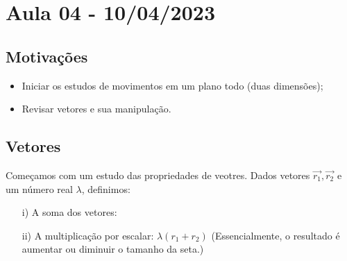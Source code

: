 \documentclass[PhysicsI/physics_notes.tex]{subfiles}
\begin{document}
\section{Aula 04 - 10/04/2023}
\subsection{Motivações}
\begin{itemize}
	\item Iniciar os estudos de movimentos em um plano todo (duas dimensões);
	\item Revisar vetores e sua manipulação.
\end{itemize}

\subsection{Vetores}
Começamos com um estudo das propriedades de veotres. Dados vetores $\vec{r_{1}}, \vec{r_{2}}$ e um número real $\lambda$, definimos:
\begin{itemize}
	\item[i)] A soma dos vetores:
	      \begin{center}
	      \end{center}
	\item[ii)] A multiplicação por escalar: $\lambda(r_{1}+r_{2})$ (Essencialmente, o resultado é aumentar ou diminuir o tamanho da seta.)
	      \begin{center}
	      \end{center}
\end{itemize}
\end{document}
